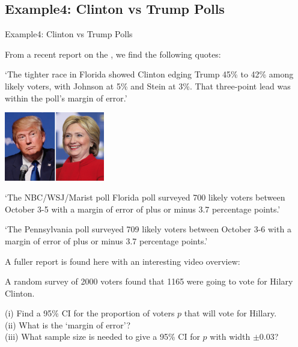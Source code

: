\documentclass[t,xcolor=pdftex,dvipsnames,table]{beamer}\usepackage[]{graphicx}\usepackage[]{color}
\begin{document}
\subsection[Examples]{Example4: Clinton vs Trump Polls}
\begin{frame}[fragile]{Example4: Clinton vs Trump Polls}

From a recent report on the \href{http://edition.cnn.com/2016/10/09/politics/hillary-clinton-donald-trump-florida-pennsylvania-polls/index.html}{}, we find the following quotes:

`The tighter race in Florida showed Clinton edging Trump 45\% to 42\% among likely voters, with Johnson at 5\% and Stein at 3\%. That three-point lead was within the poll's margin of error.'

\begin{center}
\includegraphics[height=3cm]{../images/ClintonTrump.jpg}
\end{center}
\end{frame}

\begin{frame}[fragile]{}
`The NBC/WSJ/Marist poll Florida poll surveyed 700 likely voters between October 3-5 with a margin of error of plus or minus 3.7 percentage points.' 

\vspace{.5cm}
`The Pennsylvania poll surveyed 709 likely voters between October 3-6 with a margin of error of plus or minus 3.7 percentage points.'

A fuller report is found here with an interesting video overview: 
\href{http://www.telegraph.co.uk/news/0/us-election-2016-polls-and-odds-tracker-latest-forecast-in-race/}{}

\vspace{.5cm}
A random survey of 2000 voters found that 1165 were going to vote for Hilary Clinton.  

\vspace{.5cm}
(i) Find a 95\% CI for the proportion of voters $p$ that will vote for Hillary.\\

(ii) What is the `margin of error'? \\

(iii) What sample size is needed to give a 95\% CI for $p$ with width $\pm 0.03$?
\end{frame}
\end{document}
